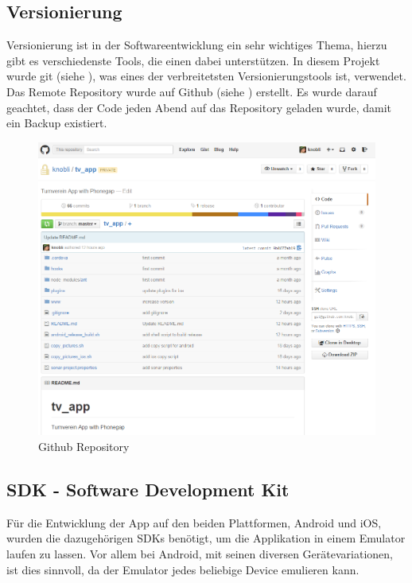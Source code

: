 \subsection{Versionierung}
Versionierung ist in der Softwareentwicklung ein sehr wichtiges Thema, hierzu gibt es verschiedenste Tools, die einen dabei unterstützen. In diesem Projekt wurde git (siehe \cite{git}), was eines der verbreitetsten Versionierungstools ist, verwendet. Das Remote Repository wurde auf Github (siehe \cite{github_app}) erstellt. Es wurde darauf geachtet, dass der Code jeden Abend auf das Repository geladen wurde, damit ein Backup existiert.

\begin{figure}[h]
\centering
\includegraphics[scale=0.5]{images/github.png}
\caption{Github Repository}
\label{fig:github_repo}
\end{figure}

\newpage
\subsection{SDK - Software Development Kit}
Für die Entwicklung der App auf den beiden Plattformen, Android und iOS, wurden die dazugehörigen SDKs benötigt, um die Applikation in einem Emulator laufen zu lassen. Vor allem bei Android, mit seinen diversen Gerätevariationen, ist dies sinnvoll, da der Emulator jedes beliebige Device emulieren kann.

